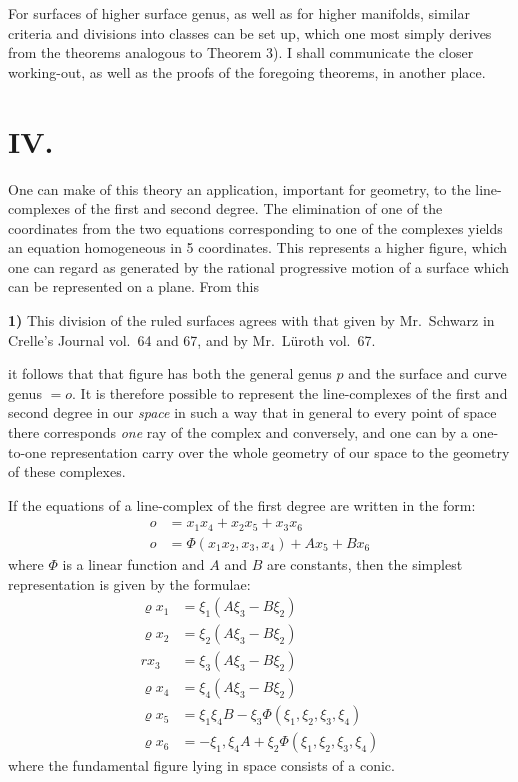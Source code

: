 \documentclass{article}
\begin{document}
For surfaces of higher surface genus, as well as for higher manifolds, similar criteria and divisions into classes can be set up, which one most simply derives from the theorems analogous to Theorem 3). I shall communicate the closer working-out, as well as the proofs of the foregoing theorems, in another place.

\section*{IV.}

One can make of this theory an application, important for geometry, to the line-complexes of the first and second degree. The elimination of one of the coordinates from the two equations corresponding to one of the complexes yields an equation homogeneous in 5 coordinates. This represents a higher figure, which one can regard as generated by the rational progressive motion of a surface which can be represented on a plane. From this

\textbf{1)} This division of the ruled surfaces agrees with that given by Mr.\ Schwarz in Crelle's Journal vol.\ 64 and 67, and by Mr.\ Lüroth vol.\ 67.

it follows that that figure has both the general genus $p$ and the surface and curve genus $= o$. It is therefore possible to represent the line-complexes of the first and second degree in our \emph{space} in such a way that in general to every point of space there corresponds \emph{one} ray of the complex and conversely, and one can by a one-to-one representation carry over the whole geometry of our space to the geometry of these complexes.

If the equations of a line-complex of the first degree are written in the form:
\[
\begin{aligned}
o &= x_1 x_4 + x_2 x_5 + x_3 x_6 \\
o &= \Phi(x_1 x_2, x_3, x_4) + A x_5 + B x_6
\end{aligned}
\tag{3}
\]
where $\Phi$ is a linear function and $A$ and $B$ are constants, then the simplest representation is given by the formulae:
\[
\begin{aligned}
\varrho x_1 &= \xi_1 (A\xi_3 - B\xi_2) \\
\varrho x_2 &= \xi_2 (A\xi_3 - B\xi_2) \\
r x_3 &= \xi_3 (A\xi_3 - B\xi_2) \\
\varrho x_4 &= \xi_4 (A\xi_3 - B\xi_2) \\
\varrho x_5 &= \xi_1 \xi_4 B - \xi_3 \Phi(\xi_1, \xi_2, \xi_3, \xi_4) \\
\varrho x_6 &= - \xi_1, \xi_4 A + \xi_2 \Phi(\xi_1, \xi_2, \xi_3, \xi_4)
\end{aligned}
\tag{4}
\]
where the fundamental figure lying in space consists of a conic.
\end{document}

